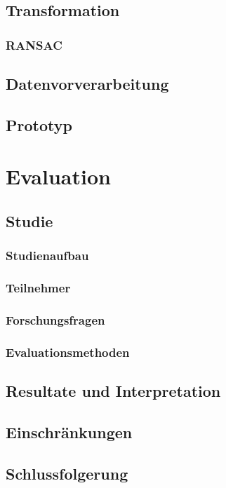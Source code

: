 \documentclass[
  ngerman,
  a4paper,  %
  twoside,  %
  bibliography=totoc,
  headsepline,
  cleardoublepage=empty,
  parskip=half,
  draft=false
]{scrbook}
\begin{document}
\section{Transformation}

\subsection{RANSAC}

\section{Datenvorverarbeitung \label{chp:datenvorbereitung}}
\section{Prototyp}

\chapter{Evaluation}
\section{Studie}
\subsection{Studienaufbau}
\subsection{Teilnehmer}
\subsection{Forschungsfragen}
\subsection{Evaluationsmethoden}
\section{Resultate und Interpretation}
\section{Einschränkungen}
\section{Schlussfolgerung}
\end{document}
